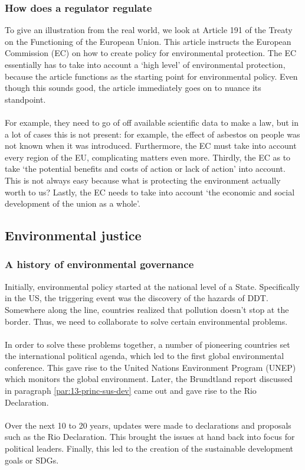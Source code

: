 \documentclass[../summary.tex]{subfiles}
\begin{document}
		\subsubsection{How does a regulator regulate}
			To give an illustration from the real world, we look at Article 191 of the Treaty on the Functioning of the European Union. This article instructs the European Commission (EC) on how to create policy for environmental protection. The EC essentially has to take into account a `high level' of environmental protection, because the article functions as the starting point for environmental policy. Even though this sounds good, the article immediately goes on to nuance its standpoint.\\
			\\
			 For example, they need to go of off available scientific data to make a law, but in a lot of cases this is not present: for example, the effect of asbestos on people was not known when it was introduced.  Furthermore, the EC must take into account every region of the EU, complicating matters even more. Thirdly, the EC as to take `the potential benefits and costs of action or lack of action' into account. This is not always easy because what is protecting the environment actually worth to us? Lastly, the EC needs to take into account `the economic and social development of the union as a whole'.
	
	\subsection{Environmental justice}
		\subsubsection{A history of environmental governance}
			Initially, environmental policy started at the national level of a State. Specifically in the US, the triggering event was the discovery of the hazards of DDT. Somewhere along the line, countries realized that pollution doesn't stop at the border. Thus, we need to collaborate to solve certain environmental problems. \\
			\\
			In order to solve these problems together, a number of pioneering countries set the international political agenda, which led to the first global environmental conference. This gave rise to the United Nations Environment Program (UNEP) which monitors the global environment. Later, the Brundtland report discussed in paragraph \ref{par:13-princ-sus-dev} came out and gave rise to the Rio Declaration. \\
			\\
			Over the next 10 to 20 years, updates were made to declarations and proposals such as the Rio Declaration. This brought the issues at hand back into focus for political leaders. Finally, this led to the creation of the sustainable development goals or SDGs. 
		
\end{document}
